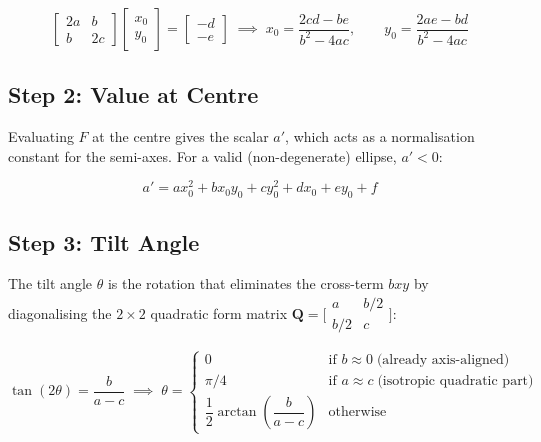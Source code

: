 \documentclass{article}
\begin{document}
	\begin{equation}
		\begin{bmatrix} 2a & b \\ b & 2c \end{bmatrix}
		\begin{bmatrix} x_0 \\ y_0 \end{bmatrix}
		=
		\begin{bmatrix} -d \\ -e \end{bmatrix}
		\;\implies\;
		x_0 = \frac{2cd - be}{b^2 - 4ac}, \qquad
		y_0 = \frac{2ae - bd}{b^2 - 4ac}
		\label{eq:centre}
	\end{equation}
	
	\subsection{Step 2: Value at Centre}
	
	Evaluating $F$ at the centre gives the scalar $a'$,
	which acts as a normalisation constant for the semi-axes.
	For a valid (non-degenerate) ellipse, $a' < 0$:
	
	\begin{equation}
		a' = ax_0^2 + bx_0 y_0 + cy_0^2 + dx_0 + ey_0 + f
		\label{eq:aprime}
	\end{equation}
	
	\subsection{Step 3: Tilt Angle}
	
	The tilt angle $\theta$ is the rotation that eliminates the
	cross-term $bxy$ by diagonalising the $2\times2$ quadratic
	form matrix $\mathbf{Q} =
	\bigl[\begin{smallmatrix}a&b/2\\b/2&c\end{smallmatrix}\bigr]$:
	
	\begin{equation}
		\tan(2\theta) = \frac{b}{a - c}
		\;\implies\;
		\theta =
		\begin{cases}
			0       & \text{if } b \approx 0
			\;\text{(already axis-aligned)}\\
			\pi/4   & \text{if } a \approx c
			\;\text{(isotropic quadratic part)}\\
			\dfrac{1}{2}\arctan\!\left(\dfrac{b}{a-c}\right)
			& \text{otherwise}
		\end{cases}
		\label{eq:angle}
	\end{equation}
	
\end{document}
